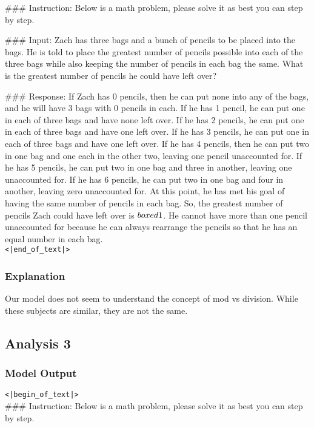 \#\#\# Instruction: Below is a math problem, please solve it as best you can step by step.

\#\#\# Input: Zach has three bags and a bunch of pencils to be placed into the bags. He is told to place the greatest number of pencils possible into each of the three bags while also keeping the number of pencils in each bag the same. What is the greatest number of pencils he could have left over?

\#\#\# Response: If Zach has 0 pencils, then he can put none into any of the bags, and he will have 3 bags with 0 pencils in each. If he has 1 pencil, he can put one in each of three bags and have none left over. If he has 2 pencils, he can put one in each of three bags and have one left over. If he has 3 pencils, he can put one in each of three bags and have one left over. If he has 4 pencils, then he can put two in one bag and one each in the other two, leaving one pencil unaccounted for. If he has 5 pencils, he can put two in one bag and three in another, leaving one unaccounted for. If he has 6 pencils, he can put two in one bag and four in another, leaving zero unaccounted for. At this point, he has met his goal of having the same number of pencils in each bag. So, the greatest number of pencils Zach could have left over is $\\boxed{1}$. He cannot have more than one pencil unaccounted for because he can always rearrange the pencils so that he has an equal number in each bag. 
\\\texttt{<|end\_of\_text|>} 

\subsubsection{Explanation}

Our model does not seem to understand the concept of mod vs division. While these subjects are similar, they are not the same. 

\subsection{Analysis 3}
\subsubsection{Model Output} 
\texttt{<|begin\_of\_text|>} \\

\#\#\# Instruction: Below is a math problem, please solve it as best you can step by step. 

